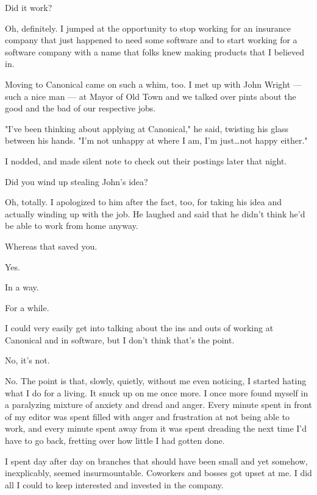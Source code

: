 \begin{ally}
Did it work?
\end{ally}
Oh, definitely. I jumped at the opportunity to stop working for an insurance company that just happened to need some software and to start working for a software company with a name that folks knew making products that I believed in.

Moving to Canonical came on such a whim, too. I met up with John Wright --- such a nice man --- at Mayor of Old Town and we talked over pints about the good and the bad of our respective jobs.

"I've been thinking about applying at Canonical," he said, twisting his glass between his hands. "I'm not unhappy at where I am, I'm just\ldots{}not happy either."

I nodded, and made silent note to check out their postings later that night.

\begin{ally}
Did you wind up stealing John's idea?
\end{ally}
Oh, totally. I apologized to him after the fact, too, for taking his idea and actually winding up with the job. He laughed and said that he didn't think he'd be able to work from home anyway.

\begin{ally}
Whereas that saved you.
\end{ally}
Yes.

In a way.

For a while.

\newpage

I could very easily get into talking about the ins and outs of working at Canonical and in software, but I don't think that's the point.

\begin{ally}
No, it's not.
\end{ally}
No. The point is that, slowly, quietly, without me even noticing, I started hating what I do for a living. It snuck up on me once more. I once more found myself in a paralyzing mixture of anxiety and dread and anger. Every minute spent in front of my editor was spent filled with anger and frustration at not being able to work, and every minute spent away from it was spent dreading the next time I'd have to go back, fretting over how little I had gotten done.

I spent day after day on branches that should have been small and yet somehow, inexplicably, seemed insurmountable. Coworkers and bosses got upset at me. I did all I could to keep interested and invested in the company.

